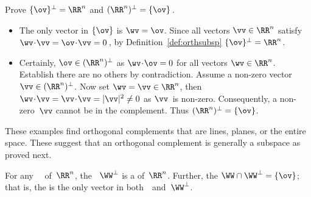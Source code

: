 \begin{example} \label{eg:}
Prove \(\{\ov\}^\perp=\RR^n\) and \((\RR^n)^\perp=\{\ov\}\)\,.
\begin{solution} 
\begin{itemize}
\item The only vector in \(\{\ov\}\) is \(\wv=\ov\).
Since all vectors \(\vv\in\RR^n\) satisfy \(\wv\cdot\vv=\ov\cdot\vv=0\)\,, by Definition~\ref{def:orthsubsp} \(\{\ov\}^\perp=\RR^n\).

\item Certainly, \(\ov\in(\RR^n)^\perp\) as \(\wv\cdot\ov=0\) for all vectors \(\wv\in\RR^n\).
Establish there are no others by contradiction.
Assume a non-zero vector \(\vv\in(\RR^n)^\perp\).
Now set \(\wv=\vv\in\RR^n\), then \(\wv\cdot\vv=\vv\cdot\vv=|\vv|^2\neq0\) as \(\vv\)~is non-zero.
Consequently, a non-zero~\(\vv\) cannot be in the complement.
Thus \((\RR^n)^\perp=\{\ov\}\).
\end{itemize}
\end{solution}
\end{example}


%
%
%

These examples find orthogonal complements that are lines, planes, or the entire space.  
These suggest that an orthogonal complement is generally a subspace as proved next.

\begin{theorem} \label{thm:perpnull}
For any ~\WW\ of~\(\RR^n\),  the ~\(\WW^\perp\) is a  of~\(\RR^n\).
Further, the  \(\WW\cap\WW^\perp=\{\ov\}\); that is, the  is the only vector in both~\WW\ and~\(\WW^\perp\).
\end{theorem}

